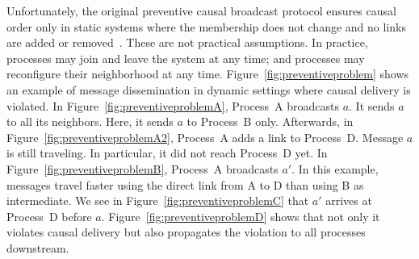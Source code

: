 \begin{figure*}
  \begin{center}
    \hspace{20pt}
    \hspace{20pt}
    \hspace{20pt}
    \hspace{20pt}
    \caption{\label{fig:preventiveproblem}Preventive causal broadcast may
      violate causal order in dynamic settings.}
  \end{center}
\end{figure*}


Unfortunately, the original preventive causal broadcast protocol ensures causal
order only in static systems where the membership does not change and no links
are added or removed~\cite{friedman2004causal}. These are not practical
assumptions.  In practice, processes may join and leave the system at any time;
and processes may reconfigure their neighborhood at any time.
Figure~\ref{fig:preventiveproblem} shows an example of message dissemination in
dynamic settings where causal delivery is violated. In
Figure~\ref{fig:preventiveproblemA}, Process~A broadcasts $a$. It sends $a$ to
all its neighbors. Here, it sends $a$ to Process~B only.  Afterwards, in
Figure~\ref{fig:preventiveproblemA2}, Process~A adds a link to
Process~D. Message $a$ is still traveling. In particular, it did not reach
Process~D yet. In Figure~\ref{fig:preventiveproblemB}, Process~A broadcasts
$a'$. In this example, messages travel faster using the direct link from A to D
than using B as intermediate.  We see in Figure~\ref{fig:preventiveproblemC}
that $a'$ arrives at Process~D before $a$. Figure~\ref{fig:preventiveproblemD}
shows that not only it violates causal delivery but also propagates the
violation to all processes downstream.

